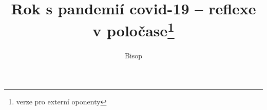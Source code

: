 \documentclass{book}
\begin{document}
\title{Rok s pandemií covid-19 -- reflexe v poločase\footnote{verze pro externí oponenty}}
\author{Bisop}
\maketitle

























%
% 



\printbibliography
\tableofcontents
\end{document}
